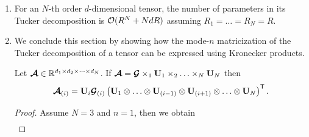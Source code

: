 \begin{remark}
\begin{enumerate}
\begin{proof}
\begin{align*}
\begin{tikzpicture}[baseline=-0.5ex]
{    }, shift={(\x+12.2,\y)}] (Q_1)  {\scalebox{0.85}{$\Qb_1$}};  \node[tensor, path picture={
    \fill[fill=red!40!white](path picture bounding box.south east)
    -- 
    (path picture bounding box.north west) --
    (path picture bounding box.north east) -- cycle;
    }, shift={(\x+13.2,\y)}] (Q_2) {\scalebox{0.85}{$\Qb_2$}};
    \node[tensor, path picture={
    \fill[fill=blue!40!white](path picture bounding box.south east)
    -- 
    (path picture bounding box.north west) --
    (path picture bounding box.north east) -- cycle;
    }, shift={(\x+14.2,\y)}] (Q_3) {\scalebox{0.85}{$\Qb_3$}};
        \node[tensor, path picture={
    \fill[fill=blue!20!white](path picture bounding box.south east)
    -- 
    (path picture bounding box.north west) --
    (path picture bounding box.north east) -- cycle;
    }, shift={(\x+15.2,\y)}] (Q_4) {\scalebox{0.85}{$\Qb_4$}};
     \draw[edge] (Q_1) -- (\x+12.2,\y-0.7) node [midway, left] {\scalebox{0.7}{\dimcolor{$d_1$}}};
    \draw[edge] (Q_2) -- (\x+13.2,\y-0.7) node [midway, left] {\scalebox{0.7}{\dimcolor{$d_2$}}};
    \draw[edge] (Q_3) -- (\x+14.2,\y-0.7) node [midway, left] {\scalebox{0.7}{\dimcolor{$d_3$}}};
    \draw[edge] (Q_4) -- (\x+15.2,\y-0.7) node [midway, left] {\scalebox{0.7}{\dimcolor{$d_4$}}};
    \draw[edge](G) -- (Q_1)node[midway,above]{\scalebox{0.7}{\dimcolor{$R_1$}}};
    \draw[edge](G) -- (Q_2)node[midway,right]{\scalebox{0.7}{\dimcolor{$R_2$}}};
    \draw[edge](G) -- (Q_3)node[midway,right]{\scalebox{0.7}{\dimcolor{$R_3$}}};
    \draw[edge](G) -- (\x+15.2,\y+0.25)node[midway,above]{\scalebox{0.7}{\dimcolor{$R_4$}}};
\end{tikzpicture}.
\end{align*}
\end{proof}
\item For an $N$-th order $d$-dimensional tensor, the number of parameters in its Tucker decomposition is $\mathcal{O}(R^N+NdR)$ assuming $R_1=\dots=R_N=R$.
\item
We conclude this section by showing how the mode-$n$ matricization of the Tucker decomposition of a tensor can be expressed using Kronecker products.
\begin{proposition}\label{decomp:tucker-kron}
Let $\bm{\mathcal{A}}\in\mathbb{R}^{d_1\times d_2\times\dots\times d_N}$. If $\At=\Gt\ttm{1}\Ub_1\ttm{2}\dots\ttm{N}\Ub_N$ then
$$\At_{(i)}=\Ub_i\Gt_{(i)}\left(\Ub_1\kron\dots\kron\Ub_{(i-1)}\kron\Ub_{(i+1)}\kron\dots\kron\Ub_N\right)^\ts.$$
\begin{proof}
Assume $N=3$ and $n=1$, then we obtain
\begin{align*}

\end{align*}
\end{proof}
\end{proposition}
\end{enumerate}
\end{remark}
